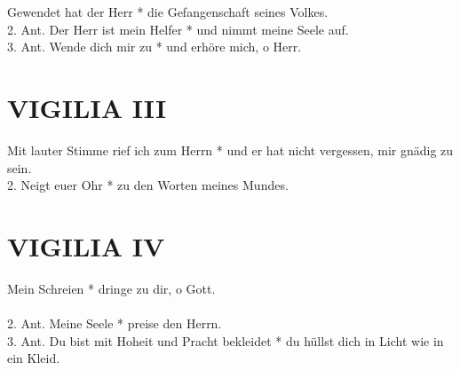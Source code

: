 \begin{sloppypar}
{ Gewendet hat der Herr * die Gefangenschaft seines Volkes.  \\
2. Ant. Der Herr ist mein Helfer * und nimmt meine Seele auf.  \\
3. Ant. Wende dich mir zu * und erhöre mich, o Herr.  \\}
\end{sloppypar}

\begin{flushleft}


\end{flushleft}

\section{VIGILIA III}

\begin{sloppypar}
{ Mit lauter Stimme rief ich zum Herrn * und er hat nicht vergessen, mir gnädig zu sein. \\
2. Neigt euer Ohr * zu den Worten meines Mundes. \\}
\end{sloppypar}

\begin{flushleft}


\end{flushleft}


\section{VIGILIA IV}

\begin{sloppypar}
{ Mein Schreien * dringe zu dir, o Gott.\\ \\
2. Ant. Meine Seele * preise den Herrn. \\
3. Ant. Du bist mit Hoheit und Pracht bekleidet * du hüllst dich in Licht wie in ein Kleid. \\}
\end{sloppypar}

\begin{flushleft}


\end{flushleft}

